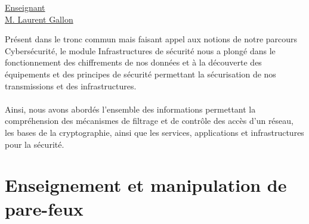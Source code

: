 \renewcommand{\figurename}{}

\vspace*{0.2cm}%
      \large
      \href{}{\color{black}Enseignant\\M. Laurent Gallon}\\%
      \normalsize
\vspace*{0.5cm}%

Présent dans le tronc commun mais faisant appel aux notions de notre parcours Cybersécurité, le module Infrastructures de sécurité nous a plongé dans le fonctionnement des chiffrements de nos données et à la découverte des équipements et des principes de sécurité permettant la sécurisation de nos transmissions et des infrastructures.
\\ \\
Ainsi, nous avons abordés l'ensemble des informations permettant la compréhension des mécanismes de filtrage et de contrôle des accès d'un réseau, les bases de la cryptographie, ainsi que les services, applications et infrastructures pour la sécurité.

\section{Enseignement et manipulation de pare-feux}


